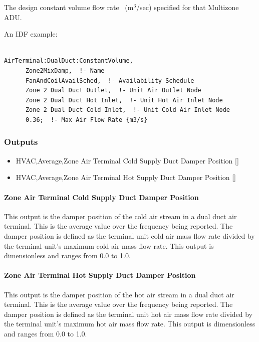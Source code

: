 The design constant volume flow rate~ (m\(^{3}\)/sec) specified for that Multizone ADU.

An IDF example:

\begin{lstlisting}

AirTerminal:DualDuct:ConstantVolume,
      Zone2MixDamp,  !- Name
      FanAndCoilAvailSched,  !- Availability Schedule
      Zone 2 Dual Duct Outlet,  !- Unit Air Outlet Node
      Zone 2 Dual Duct Hot Inlet,  !- Unit Hot Air Inlet Node
      Zone 2 Dual Duct Cold Inlet,  !- Unit Cold Air Inlet Node
      0.36;  !- Max Air Flow Rate {m3/s}
\end{lstlisting}

\subsubsection{Outputs}\label{outputs-12}

\begin{itemize}
\item
  HVAC,Average,Zone Air Terminal Cold Supply Duct Damper Position {[]}
\item
  HVAC,Average,Zone Air Terminal Hot Supply Duct Damper Position {[]}
\end{itemize}

\paragraph{Zone Air Terminal Cold Supply Duct Damper Position}\label{zone-air-terminal-cold-supply-duct-damper-position}

This output is the damper position of the cold air stream in a dual duct air terminal. This is the average value over the frequency being reported. The damper position is defined as the terminal unit cold air mass flow rate divided by the terminal unit's maximum cold air mass flow rate. This output is dimensionless and ranges from 0.0 to 1.0.

\paragraph{Zone Air Terminal Hot Supply Duct Damper Position}\label{zone-air-terminal-hot-supply-duct-damper-position}

This output is the damper position of the hot air stream in a dual duct air terminal. This is the average value over the frequency being reported. The damper position is defined as the terminal unit hot air mass flow rate divided by the terminal unit's maximum hot air mass flow rate. This output is dimensionless and ranges from 0.0 to 1.0.

